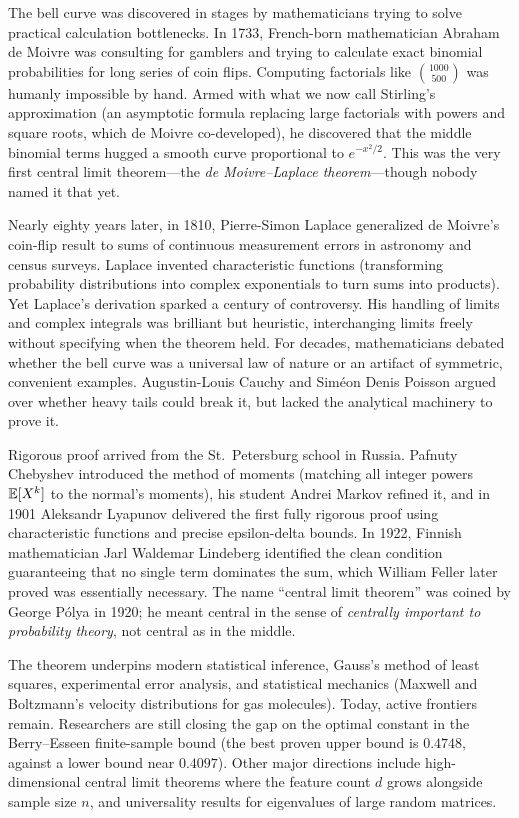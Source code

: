 \begin{historybox}
The bell curve was discovered in stages by mathematicians trying to solve practical
calculation bottlenecks. In 1733, French-born mathematician Abraham de Moivre was
consulting for gamblers and trying to calculate exact binomial probabilities for long series
of coin flips. Computing factorials like $\binom{1000}{500}$ was humanly impossible by hand.
Armed with what we now call Stirling's approximation (an asymptotic formula replacing large
factorials with powers and square roots, which de Moivre co-developed), he discovered that
the middle binomial terms hugged a smooth curve proportional to $e^{-x^2/2}$. This was the
very first central limit theorem---the \emph{de Moivre--Laplace theorem}---though nobody named
it that yet.

Nearly eighty years later, in 1810, Pierre-Simon Laplace generalized de Moivre's coin-flip
result to sums of continuous measurement errors in astronomy and census surveys. Laplace
invented characteristic functions (transforming probability distributions into complex
exponentials to turn sums into products). Yet Laplace's derivation sparked a century of
controversy. His handling of limits and complex integrals was brilliant but heuristic,
interchanging limits freely without specifying when the theorem held. For decades,
mathematicians debated whether the bell curve was a universal law of nature or an artifact
of symmetric, convenient examples. Augustin-Louis Cauchy and Sim\'eon Denis Poisson argued
over whether heavy tails could break it, but lacked the analytical machinery to prove it.

Rigorous proof arrived from the St.~Petersburg school in Russia. Pafnuty Chebyshev introduced
the method of moments (matching all integer powers $\operatorname{\mathbb{E}}[X^k]$ to the normal's moments), his
student Andrei Markov refined it, and in 1901 Aleksandr Lyapunov delivered the first fully
rigorous proof using characteristic functions and precise epsilon-delta bounds. In 1922,
Finnish mathematician Jarl Waldemar Lindeberg identified the clean condition guaranteeing that
no single term dominates the sum, which William Feller later proved was essentially necessary.
The name ``central limit theorem'' was coined by George P\'olya in 1920; he meant central in the
sense of \emph{centrally important to probability theory}, not central as in the middle.

The theorem underpins modern statistical inference, Gauss's method of least squares,
experimental error analysis, and statistical mechanics (Maxwell and Boltzmann's velocity
distributions for gas molecules). Today, active frontiers remain. Researchers are
still closing the gap on the optimal constant in the Berry--Esseen finite-sample
bound (the best proven upper bound is $0.4748$, against a lower bound near
$0.4097$). Other major directions include high-dimensional central limit theorems
where the feature count $d$ grows alongside sample size $n$, and universality
results for eigenvalues of large random matrices.
\end{historybox}


